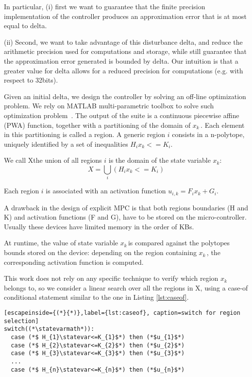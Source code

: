 \documentclass[sigconf]{acmart}
\newcommand{\statevar}{x_{k}}
\newcommand{\statevarmath}{$x_{k}\,$}
\newcommand{\statespace}{X}
\begin{document}
In particular, (i) first we want to guarantee that the finite precision implementation of the controller produces an approximation error that is at most equal to delta.

(ii) Second, we want to take advantage of this disturbance delta, and reduce the arithmetic precision used for computations and storage, while still guarantee that the approximation error generated is bounded by delta. Our intuition is that a greater value for delta allows for a reduced precision for computations (e.g. with respect to 32bits).

Given an initial delta, we design the controller by solving an off-line optimization problem. We rely on MATLAB multi-parametric toolbox to solve such optimization problem~\cite{matlabMPT, matlabYALMIP}. 
The output of the suite is a continuous piecewise affine (PWA) function, together with a partitioning of the domain of \statevarmath. Each element in this partitioning is called a region.
A generic region $i$ consists in a n-polytope, uniquely identified by a set of inequalities $H_{i}\statevar<=K_{i}$. 

We call \statespace\space the union of all regions $i$ is the domain of the state variable $x_{k}$:
\begin{equation}
\statespace = \bigcup_{i}(H_{i}\statevar<=K_{i})
\end{equation}

Each region $i$ is associated with an activation function $u_{i,k}=F_{i}x_{k}+G_{i}$.


A drawback in the design of explicit MPC is that both regions boundaries (H and K) and activation functions (F and G), have to be stored on the micro-controller. Usually these devices have limited memory in the order of KBs.

At runtime, the value of state variable \statevarmath  is compared against the polytopes bounds stored on the device: depending on the region containing \statevarmath, the corresponding activation function is computed.

This work does not rely on any specific technique to verify which region \statevarmath belongs to, so we consider a linear search over all the regions in \statespace\space, using a case-of conditional statement similar to the one in Listing \ref{lst:caseof}.

\begin{lstlisting}[escapeinside={(*}{*)},label={lst:caseof}, caption=switch for region selection]
switch((*\statevarmath*)):
  case (*$ H_{1}\statevar<=K_{1}$*) then (*$u_{1}$*)
  case (*$ H_{2}\statevar<=K_{2}$*) then (*$u_{2}$*)
  case (*$ H_{3}\statevar<=K_{3}$*) then (*$u_{3}$*)
  ...
  case (*$ H_{n}\statevar<=K_{n}$*) then (*$u_{n}$*)
\end{lstlisting}
\end{document}
